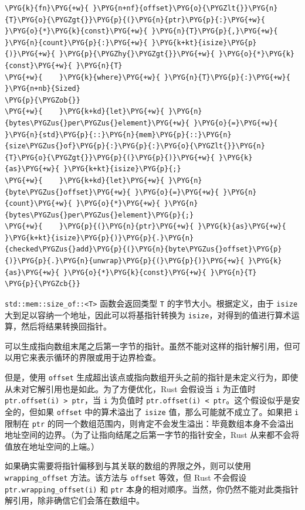 \begin{Verbatim}[commandchars=\\\{\},breaklines=true,breakanywhere=true,fontsize=\codefont,xleftmargin=17bp]
\PYG{k}{fn}\PYG{+w}{ }\PYG{n+nf}{offset}\PYG{o}{\PYGZlt{}}\PYG{n}{T}\PYG{o}{\PYGZgt{}}\PYG{p}{(}\PYG{n}{ptr}\PYG{p}{:}\PYG{+w}{ }\PYG{o}{*}\PYG{k}{const}\PYG{+w}{ }\PYG{n}{T}\PYG{p}{,}\PYG{+w}{ }\PYG{n}{count}\PYG{p}{:}\PYG{+w}{ }\PYG{k+kt}{isize}\PYG{p}{)}\PYG{+w}{ }\PYG{p}{\PYGZhy{}\PYGZgt{}}\PYG{+w}{ }\PYG{o}{*}\PYG{k}{const}\PYG{+w}{ }\PYG{n}{T}
\PYG{+w}{    }\PYG{k}{where}\PYG{+w}{ }\PYG{n}{T}\PYG{p}{:}\PYG{+w}{ }\PYG{n+nb}{Sized}
\PYG{p}{\PYGZob{}}
\PYG{+w}{    }\PYG{k+kd}{let}\PYG{+w}{ }\PYG{n}{bytes\PYGZus{}per\PYGZus{}element}\PYG{+w}{ }\PYG{o}{=}\PYG{+w}{ }\PYG{n}{std}\PYG{p}{::}\PYG{n}{mem}\PYG{p}{::}\PYG{n}{size\PYGZus{}of}\PYG{p}{:}\PYG{p}{:}\PYG{o}{\PYGZlt{}}\PYG{n}{T}\PYG{o}{\PYGZgt{}}\PYG{p}{(}\PYG{p}{)}\PYG{+w}{ }\PYG{k}{as}\PYG{+w}{ }\PYG{k+kt}{isize}\PYG{p}{;}
\PYG{+w}{    }\PYG{k+kd}{let}\PYG{+w}{ }\PYG{n}{byte\PYGZus{}offset}\PYG{+w}{ }\PYG{o}{=}\PYG{+w}{ }\PYG{n}{count}\PYG{+w}{ }\PYG{o}{*}\PYG{+w}{ }\PYG{n}{bytes\PYGZus{}per\PYGZus{}element}\PYG{p}{;}
\PYG{+w}{    }\PYG{p}{(}\PYG{n}{ptr}\PYG{+w}{ }\PYG{k}{as}\PYG{+w}{ }\PYG{k+kt}{isize}\PYG{p}{)}\PYG{p}{.}\PYG{n}{checked\PYGZus{}add}\PYG{p}{(}\PYG{n}{byte\PYGZus{}offset}\PYG{p}{)}\PYG{p}{.}\PYG{n}{unwrap}\PYG{p}{(}\PYG{p}{)}\PYG{+w}{ }\PYG{k}{as}\PYG{+w}{ }\PYG{o}{*}\PYG{k}{const}\PYG{+w}{ }\PYG{n}{T}
\PYG{p}{\PYGZcb{}}
\end{Verbatim}

\texttt{std::mem::size\_of::<T>} 函数会返回类型 \texttt{T} 的字节大小。根据定义，由于 \texttt{isize} 大到足以容纳一个地址，因此可以将基指针转换为 \texttt{isize}，对得到的值进行算术运算，然后将结果转换回指针。

可以生成指向数组末尾之后第一字节的指针。虽然不能对这样的指针解引用，但可以用它来表示循环的界限或用于边界检查。

但是，使用 \texttt{offset} 生成超出该点或指向数组开头之前的指针是未定义行为，即使从未对它解引用也是如此。为了方便优化，Rust 会假设当 \texttt{i} 为正值时 \texttt{ptr.offset(i) > ptr}，当 \texttt{i} 为负值时 \texttt{ptr.offset(i) < ptr}。这个假设似乎是安全的，但如果 \texttt{offset} 中的算术溢出了 \texttt{isize} 值，那么可能就不成立了。如果把 \texttt{i} 限制在 \texttt{ptr} 的同一个数组范围内，则肯定不会发生溢出：毕竟数组本身不会溢出地址空间的边界。（为了让指向结尾之后第一字节的指针安全，Rust 从来都不会将值放在地址空间的上端。）

如果确实需要将指针偏移到与其关联的数组的界限之外，则可以使用 \texttt{wrapping\_offset} 方法。该方法与 \texttt{offset} 等效，但 Rust 不会假设 \texttt{ptr.wrapping\_offset(i)} 和 \texttt{ptr} 本身的相对顺序。当然，你仍然不能对此类指针解引用，除非确信它们会落在数组中。

